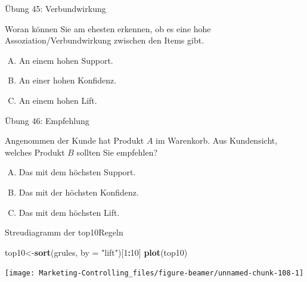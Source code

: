 \documentclass[12pt,ngerman,a4paper,ignorenonframetext,]{beamer}
\newenvironment{Shaded}{\begin{snugshade}}{\end{snugshade}}
\newcommand{\DataTypeTok}[1]{\textcolor[rgb]{0.13,0.29,0.53}{#1}}
\newcommand{\DecValTok}[1]{\textcolor[rgb]{0.00,0.00,0.81}{#1}}
\newcommand{\KeywordTok}[1]{\textcolor[rgb]{0.13,0.29,0.53}{\textbf{#1}}}
\newcommand{\NormalTok}[1]{#1}
\newcommand{\OperatorTok}[1]{\textcolor[rgb]{0.81,0.36,0.00}{\textbf{#1}}}
\newcommand{\StringTok}[1]{\textcolor[rgb]{0.31,0.60,0.02}{#1}}
\providecommand{\tightlist}{%
  \setlength{\itemsep}{0pt}\setlength{\parskip}{0pt}}
\begin{document}
\begin{frame}{Übung 45: Verbundwirkung}
\protect\hypertarget{ubung-45-verbundwirkung}{}

Woran können Sie am ehesten erkennen, ob es eine hohe
Assoziation\thinspace{}/\thinspace{}Verbundwirkung zwischen den Items
gibt.

\begin{enumerate}
[A.]
\tightlist
\item
  An einem hohen Support.
\item
  An einer hohen Konfidenz.
\item
  An einem hohen Lift.
\end{enumerate}


\end{frame}

\begin{frame}{Übung 46: Empfehlung}
\protect\hypertarget{ubung-46-empfehlung}{}

Angenommen der Kunde hat Produkt \(A\) im Warenkorb. Aus Kundensicht,
welches Produkt \(B\) sollten Sie empfehlen?

\begin{enumerate}
[A.]
\tightlist
\item
  Das mit dem höchsten Support.
\item
  Das mit der höchsten Konfidenz.
\item
  Das mit dem höchsten Lift.
\end{enumerate}


\end{frame}

\begin{frame}{Streudiagramm der top10Regeln}
\protect\hypertarget{streudiagramm-der-top10regeln}{}

\begin{Shaded}
\begin{Highlighting}[]
\NormalTok{top10<-}\KeywordTok{sort}\NormalTok{(grules, }\DataTypeTok{by =} \StringTok{"lift"}\NormalTok{)[}\DecValTok{1}\OperatorTok{:}\DecValTok{10}\NormalTok{]}
\KeywordTok{plot}\NormalTok{(top10)}
\end{Highlighting}
\end{Shaded}

\begin{center}\texttt{[image: Marketing-Controlling\_files/figure-beamer/unnamed-chunk-108-1]} \end{center}

\end{frame}
\end{document}
